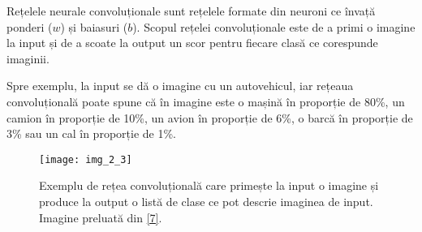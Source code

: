 Rețelele neurale convoluționale sunt rețelele formate din neuroni ce învață ponderi ($w$) și baiasuri ($b$). Scopul rețelei convoluționale este de a primi o imagine la input și de a scoate la output un scor pentru fiecare clasă ce corespunde imaginii. 

Spre exemplu, la input se dă o imagine cu un autovehicul, iar rețeaua convoluțională poate spune că în imagine este o mașină în proporție de 80\%, un camion în proporție de 10\%, un avion în proporție de 6\%, o barcă în proporție de 3\% sau un cal în proporție de 1\%.
\begin{figure}[!h]
	\centering
	\texttt{[image: img\_2\_3]}
	\caption[Exemplu rețea convoluțională]{Exemplu de rețea convoluțională care primește la input o imagine și produce la output o listă de clase ce pot descrie imaginea de input. Imagine preluată din \hyperlink{datameetsmedia}{[7]}.}
\end{figure} 

